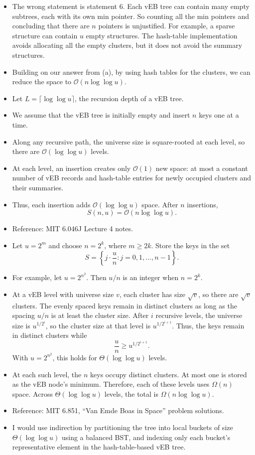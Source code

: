 \documentclass{article}
\begin{document}
\begin{itemize}

    \item[(a)] The wrong statement is statement 6. Each vEB tree can contain many empty subtrees, each with its own min pointer. So counting all the min pointers and concluding that there are $n$ pointers is unjustified. For example, a sparse structure can contain $u$ empty structures. The hash-table implementation avoids allocating all the empty clusters, but it does not avoid the summary structures.
    \item[(c)] Building on our answer from (a), by using hash tables for the clusters, we can reduce the space to $\mathcal{O}(n \log\log u)$.
    \item Let $L = \lceil \log\log u \rceil$, the recursion depth of a vEB tree.
    \item We assume that the vEB tree is initially empty and insert $n$ keys one at a time.
    \item Along any recursive path, the universe size is square-rooted at each level, so there are $\mathcal{O}(\log\log u)$ levels.
    \item At each level, an insertion creates only $\mathcal{O}(1)$ new space: at most a constant number of vEB records and hash-table entries for newly occupied clusters and their summaries.
    \item Thus, each insertion adds $\mathcal{O}(\log\log u)$ space. After $n$ insertions,
    \[
        S(n,u) = \mathcal{O}(n \log\log u).
    \]
    \item Reference: MIT 6.046J Lecture 4 notes.
    \item[(d)] Let $u = 2^m$ and choose $n = 2^k$, where $m \geq 2k$. Store the keys in the set
    \[
        S = \left\{j \cdot \frac{u}{n} : j = 0,1,\ldots,n-1\right\}.
    \]
    \item For example, let $u = 2^{n^2}$. Then $u/n$ is an integer when $n = 2^k$.
    \item At a vEB level with universe size $v$, each cluster has size $\sqrt{v}$, so there are $\sqrt{v}$ clusters. The evenly spaced keys remain in distinct clusters as long as the spacing $u/n$ is at least the cluster size. After $i$ recursive levels, the universe size is $u^{1/2^i}$, so the cluster size at that level is $u^{1/2^{i+1}}$. Thus, the keys remain in distinct clusters while
    \[
        \frac{u}{n} \geq u^{1/2^{i+1}}.
    \]
    With $u = 2^{n^2}$, this holds for $\Theta(\log\log u)$ levels.
    \item At each such level, the $n$ keys occupy distinct clusters. At most one is stored as the vEB node's minimum. Therefore, each of these levels uses $\Omega(n)$ space. Across $\Theta(\log\log u)$ levels, the total is $\Omega(n \log\log u)$.
    \item Reference: MIT 6.851, ``Van Emde Boas in Space'' problem solutions.
    \item[(e)] I would use indirection by partitioning the tree into local buckets of size $\Theta(\log\log u)$ using a balanced BST, and indexing only each bucket's representative element in the hash-table-based vEB tree.
 

\end{itemize}
\end{document}
